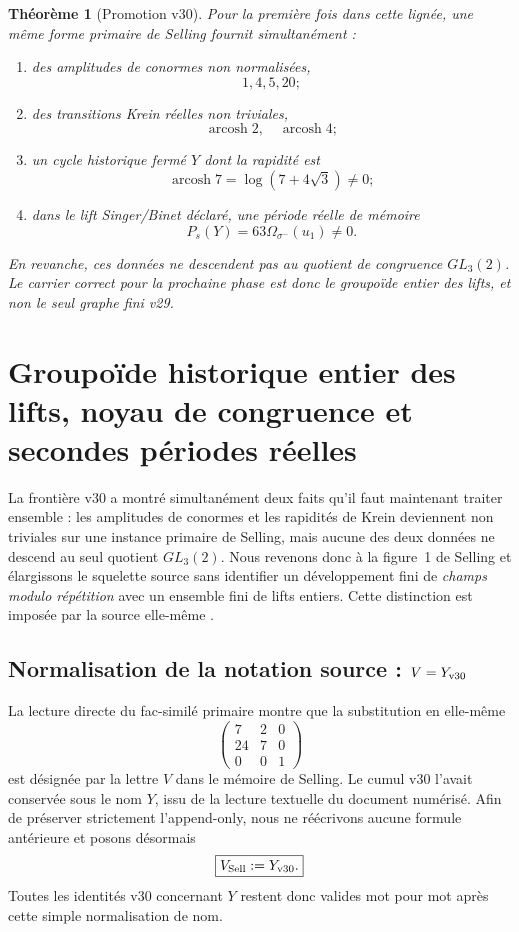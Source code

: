 \documentclass[11pt,a4paper]{article}
\newtheorem{theorem}{Théorème}[section]
\begin{document}
\begin{theorem}[Promotion v30]\label{thm:v30-verdict}
Pour la première fois dans cette lignée, une même forme primaire de Selling fournit simultanément :
\begin{enumerate}[label=\textup{(\roman*)}]
\item des amplitudes de conormes non normalisées,
\[
 1,4,5,20;
\]
\item des transitions Krein réelles non triviales,
\[
 \operatorname{arcosh}2,\quad
 \operatorname{arcosh}4;
\]
\item un cycle historique fermé $Y$ dont la rapidité est
\[
 \boxed{
 \operatorname{arcosh}7
 =
 \log(7+4\sqrt3)\neq0;}
\]
\item dans le lift Singer/Binet déclaré, une période réelle de mémoire
\[
 \boxed{
 P_s(Y)
 =
 63\Omega_{\sigma^-}(u_1)\neq0.}
\]
\end{enumerate}
En revanche, ces données ne descendent pas au quotient de congruence $GL_3(2)$. Le carrier correct pour la prochaine phase est donc le groupoïde entier des lifts, et non le seul graphe fini v29.
\end{theorem}


\section{Groupoïde historique entier des lifts, noyau de congruence et secondes périodes réelles}\label{sec:v31-historical-lift-groupoid}

La frontière v30 a montré simultanément deux faits qu'il faut maintenant traiter ensemble :
les amplitudes de conormes et les rapidités de Krein deviennent non triviales sur une instance
primaire de Selling, mais aucune des deux données ne descend au seul quotient $GL_3(2)$.
Nous revenons donc à la figure~1 de Selling et élargissons le squelette source sans identifier
un développement fini de \emph{champs modulo répétition} avec un ensemble fini de lifts entiers.
Cette distinction est imposée par la source elle-même \cite{Selling1877}.

\subsection{Normalisation de la notation source : \texorpdfstring{$V=Y_{\rm v30}$}{V=Yv30}}

La lecture directe du fac-similé primaire montre que la substitution en elle-même
\[
 \begin{pmatrix}
 7&2&0\\
 24&7&0\\
 0&0&1
 \end{pmatrix}
\]
est désignée par la lettre $V$ dans le mémoire de Selling. Le cumul v30 l'avait conservée sous
le nom $Y$, issu de la lecture textuelle du document numérisé. Afin de préserver strictement
l'append-only, nous ne réécrivons aucune formule antérieure et posons désormais
\begin{equation}\label{eq:v31-V-alias}
 \boxed{V_{\rm Sell}:=Y_{\rm v30}.}
\end{equation}
Toutes les identités v30 concernant $Y$ restent donc valides mot pour mot après cette simple
normalisation de nom.
\end{document}
